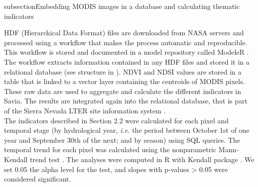 subsection{Embedding MODIS images in a database and calculating thematic indicators}\label{sec:onto:Embedding}

HDF (Hierarchical Data Format) files are downloaded from NASA servers and processed using a workflow that makes the process automatic and reproducible. This workflow is stored and documented in a model repository called ModeleR \autocite{Bonetetal2014DocumentingStoring,PerezPerezetal2012ModeleREnviromental}. The workflow extracts information contained in any HDF files and stored it in a relational database (see structure in ). NDVI and NDSI values are stored in a table that is linked to a vector layer containing the centroids of MODIS pixels. These raw data are used to aggregate and calculate the different indicators in Savia. The results are integrated again into the relational database, that is part of the Sierra Nevada LTER site information system \autocite{BonetGarciaetal2011SierraNevada}.\\
The indicators described in Section 2.2 were calculated for each pixel and temporal stage (by hydrological year, \emph{i.e.} the period between October 1st of one year and September 30th of the next; and by season) using SQL queries. The temporal trend for each pixel was calculated using the nonparametric Mann-Kendall trend test \autocite{Kendall1970RankCorrelation,Mann1945NonparametricTests}. The analyses were computed in R \autocite{RCoreTeam2013LanguageEnvironment} with Kendall package \autocite{McLeod2011KendallKendall}. We set 0.05 the alpha level for the test, and slopes with p-values \textgreater{} 0.05 were considered significant.

